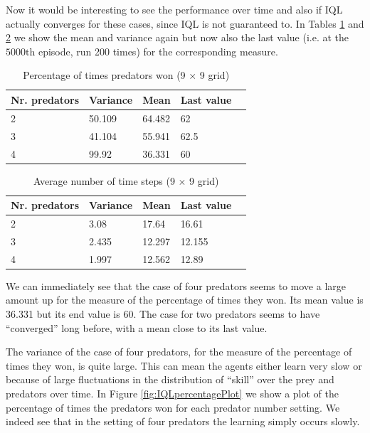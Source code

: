 \FloatBarrier

Now it would be interesting to see the performance over time and also if IQL actually converges for these cases, since IQL is not guaranteed to.
In Tables \ref{tab:percentage} and \ref{tab:timeSteps} we show the mean and variance again but now also the last value (i.e. at the $5000\mathrm{th}$ episode, run 200 times) for the corresponding  measure.

\begin{table}[hbt]
\centering
\begin{tabular}{lllll}
 Nr. predators  &  Variance& Mean & Last value   \\ 
\hline   
 2 & 50.109 & 64.482 & 62   \\ 
 3 & 41.104 & 55.941 & 62.5   \\ 
 4 & 99.92  & 36.331 & 60   \\  
\end{tabular} 
\caption{Percentage of times predators won (9 $\times$ 9 grid)}
\label{tab:percentage}
\end{table}

\begin{table}[hbt]
\centering
\begin{tabular}{lllll}
 Nr. predators  &  Variance& Mean & Last value   \\ 
\hline   
 2 &3.08 & 17.64 & 16.61   \\ 
 3 & 2.435 & 12.297 & 12.155   \\ 
 4 & 1.997  & 12.562 & 12.89   \\  
\end{tabular} 
\caption{Average number of time steps  (9 $\times$ 9 grid)}
\label{tab:timeSteps}
\end{table}

We can immediately see that the case of four predators seems to move a large amount up for the measure of the percentage of times they won. Its mean value is 36.331 but its end value is 60. The case for two predators seems to have ``converged'' long before, with a mean close to its last value.

The variance of the case of four predators, for the measure of the percentage of times they won, is quite large.
This can mean the agents either learn very slow or because of large fluctuations in the distribution of ``skill'' over the prey and predators over time. In Figure \ref{fig:IQLpercentagePlot} we show a plot of the percentage of times the predators won for each predator number setting. We indeed see that in the setting of four predators the learning simply occurs slowly.


